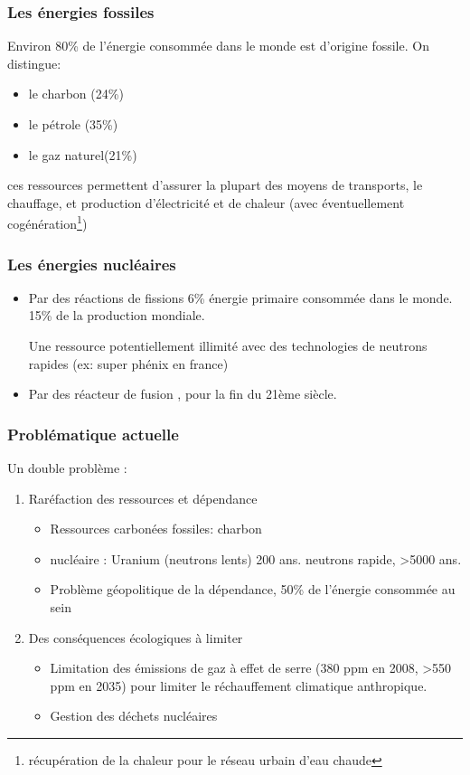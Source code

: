 \documentclass[main.tex]{subfiles}
\begin{document}
\subsubsection{Les énergies fossiles}
Environ 80\% de l'énergie consommée dans le monde est d'origine fossile. On distingue:
\begin{itemize}
\item le charbon (24\%)
\item le pétrole (35\%)
\item le gaz naturel(21\%)
\end{itemize}

ces ressources permettent d'assurer la plupart des moyens de transports, le chauffage, et production d'électricité et de chaleur (avec éventuellement cogénération\footnote{récupération de la chaleur pour le réseau urbain d'eau chaude})
\subsubsection{Les énergies nucléaires}
\begin{itemize}
\item Par des réactions de fissions
  6\% énergie primaire consommée dans le monde. 15\% de la production mondiale.
  \begin{rem}
    Une ressource potentiellement illimité avec des technologies de neutrons rapides (ex: super phénix en france)
  \end{rem}
\item Par des réacteur de fusion , pour la fin du 21ème siècle.
\end{itemize}

\subsubsection{Problématique actuelle}
Un double problème :
\begin{enumerate}
\item Raréfaction des ressources et dépendance
  \begin{itemize}
  \item Ressources carbonées fossiles: charbon
  \item nucléaire : Uranium (neutrons lents) 200 ans. neutrons rapide, >5000 ans.
  \item Problème géopolitique de la dépendance, 50\% de l'énergie consommée au sein
  \end{itemize}
\item Des conséquences écologiques à limiter
  \begin{itemize}
  \item Limitation des émissions de gaz à effet de serre (380 ppm en 2008, >550 ppm en 2035) pour limiter le réchauffement climatique anthropique.
  \item Gestion des déchets nucléaires
  \end{itemize}
\end{enumerate}
\end{document}
